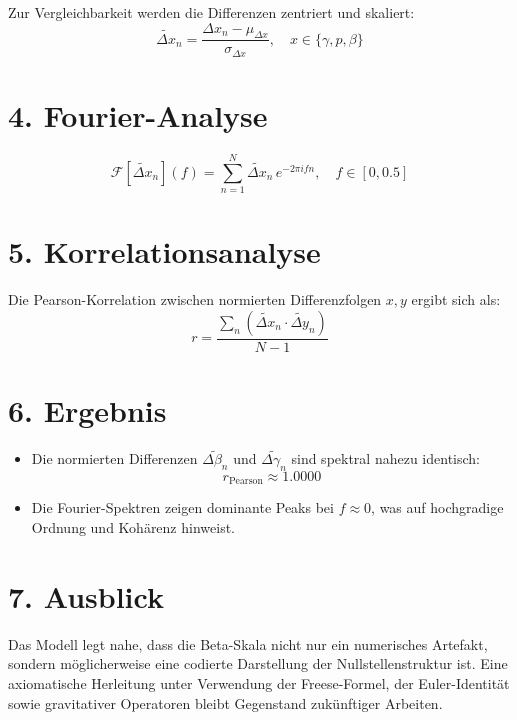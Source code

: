 \documentclass{article}
\begin{document}
Zur Vergleichbarkeit werden die Differenzen zentriert und skaliert:
\[
\tilde{\Delta x}_n = \frac{\Delta x_n - \mu_{\Delta x}}{\sigma_{\Delta x}}, \quad x \in \{\gamma, p, \beta\}
\]

\section*{4. Fourier-Analyse}

\[
\mathcal{F}[\tilde{\Delta x}_n](f) = \sum_{n=1}^{N} \tilde{\Delta x}_n \, e^{-2\pi i f n}, \quad f \in [0, 0.5]
\]

\section*{5. Korrelationsanalyse}

Die Pearson-Korrelation zwischen normierten Differenzfolgen $x, y$ ergibt sich als:
\[
r = \frac{\sum_{n} (\tilde{\Delta x}_n \cdot \tilde{\Delta y}_n)}{N - 1}
\]

\section*{6. Ergebnis}

\begin{itemize}
  \item Die normierten Differenzen $\tilde{\Delta \beta_n}$ und $\tilde{\Delta \gamma_n}$ sind spektral nahezu identisch:
  \[
  r_{\text{Pearson}} \approx 1.0000
  \]
  \item Die Fourier-Spektren zeigen dominante Peaks bei $f \approx 0$, was auf hochgradige Ordnung und Kohärenz hinweist.
\end{itemize}

\section*{7. Ausblick}

Das Modell legt nahe, dass die Beta-Skala nicht nur ein numerisches Artefakt, sondern möglicherweise eine codierte Darstellung der Nullstellenstruktur ist. Eine axiomatische Herleitung unter Verwendung der Freese-Formel, der Euler-Identität sowie gravitativer Operatoren bleibt Gegenstand zukünftiger Arbeiten.
\end{document}

